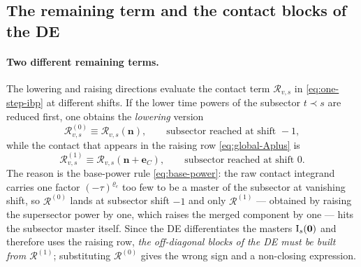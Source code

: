 \documentclass[11pt,a4paper]{article}
\numberwithin{table}{section}
\newcommand{\cR}{\mathcal R}
\begin{document}
\subsection{The remaining term and the contact blocks of the DE}
\label{sec:remaining}

\paragraph{Two different remaining terms.}
The lowering and raising directions evaluate the contact term $\cR_{v,s}$ in
\eqref{eq:one-step-ibp} at different shifts. If the lower time powers of the subsector
$t\prec s$ are reduced first, one obtains the \emph{lowering} version
\begin{equation}
  \cR_{v,s}^{(0)}\equiv\cR_{v,s}(\bm n),
  \qquad
  \text{subsector reached at shift } -1,
  \label{eq:R0}
\end{equation}
while the contact that appears in the raising row \eqref{eq:global-Aplus} is
\begin{equation}
  \cR_{v,s}^{(1)}\equiv\cR_{v,s}(\bm n+\bm e_C),
  \qquad
  \text{subsector reached at shift } 0.
  \label{eq:R1}
\end{equation}
The reason is the base-power rule \eqref{eq:base-power}: the raw contact integrand carries one
factor $(-\tau)^{\varrho_e}$ too few to be a master of the subsector at vanishing shift, so
$\cR^{(0)}$ lands at subsector shift $-1$ and only $\cR^{(1)}$ --- obtained by raising the supersector power
by one, which raises the merged component by one --- hits the subsector master itself. Since the DE
differentiates the masters $\bm{\text I}_s(\bm 0)$ and therefore uses the raising row, \emph{the
off-diagonal blocks of the DE must be built from $\cR^{(1)}$}; substituting $\cR^{(0)}$ gives the
wrong sign and a non-closing expression.
\end{document}
